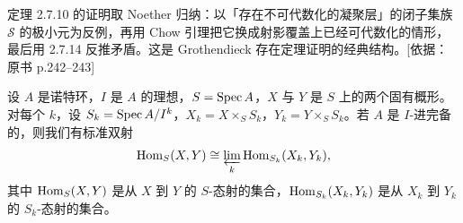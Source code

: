 \begin{tnote}
定理 2.7.10 的证明取 Noether 归纳：以「存在不可代数化的凝聚层」的闭子集族 $\mathcal{S}$ 的极小元为反例，再用 Chow 引理把它换成射影覆盖上已经可代数化的情形，最后用 2.7.14 反推矛盾。这是 Grothendieck 存在定理证明的经典结构。[依据：原书 p.242–243]
\end{tnote}

\begin{theorem}\label{it:2.7.20}
设 $A$ 是诺特环，$I$ 是 $A$ 的理想，$S=\operatorname{Spec} A$，$X$ 与 $Y$ 是 $S$ 上的两个固有概形。对每个 $k$，设 $S_k=\operatorname{Spec} A/I^k$，$X_k=X\times_S S_k$，$Y_k=Y\times_S S_k$。若 $A$ 是 $I$-进完备的，则我们有标准双射
\begin{equation*}
\operatorname{Hom}_S(X,Y)\cong\varprojlim_k\operatorname{Hom}_{S_k}(X_k,Y_k),
\end{equation*}
其中 $\operatorname{Hom}_S(X,Y)$ 是从 $X$ 到 $Y$ 的 $S$-态射的集合，$\operatorname{Hom}_{S_k}(X_k,Y_k)$ 是从 $X_k$ 到 $Y_k$ 的 $S_k$-态射的集合。
\end{theorem}

